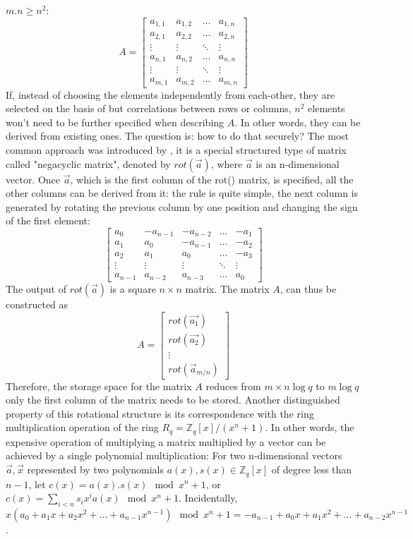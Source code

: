 \begin{description}
  $m.n \geq n^2$:
  \[
    A = \begin{bmatrix}
      a_{1,1}& a_{1,2}& \dots& a_{1,n}\\
      a_{2,1}& a_{2,2}& \dots& a_{2,n}\\
      \vdots& \vdots& \ddots& \vdots\\
      a_{n,1}& a_{n,2}& \dots& a_{n,n}\\
      \vdots& \vdots& \ddots& \vdots\\
      a_{m,1}& a_{m,2}& \dots& a_{m,n}
    \end{bmatrix}
  \]
  If, instead of choosing the elements independently from each-other, they are selected on the basis of but correlations between rows or columns, $n^2$ elements won't need to be further specified when describing $A$. In other words, they can be derived from existing
  ones. The question is: how to do that securely? The most common approach was
  introduced by \cite{hoffstein1998ntru, micciancio2007generalized}, it is a
  special structured type of matrix called "negacyclic matrix", denoted by
  $rot(\vec{a})$, where $\vec{a}$ is an n-dimensional vector. Once $\vec{a}$, which is the first column of the rot() matrix, is specified,  all the other
  columns can be derived from it: the rule is quite simple, the
  next column is generated by rotating the previous column by one position and
  changing the sign of the first element:
  \[
    \begin{bmatrix}
      a_{0}& -a_{n-1}& -a_{n-2}& \dots& -a_1\\
      a_1& a_0& -a_{n-1}& \dots& -a_2\\
      a_2& a_1& a_0& \dots& -a_3\\
      \vdots& \vdots& \vdots& \ddots& \vdots\\
      a_{n-1}& a_{n-2}& a_{n-3}& \dots& a_0
    \end{bmatrix}
  \]
  The output of $rot(\vec{a})$ is a square $n \times n$ matrix. The matrix $A$, can thus be constructed as
  \[
    A = \begin{bmatrix}
      rot(\vec{a_1})\\
      rot(\vec{a_2})\\
      \vdots\\
      rot(\vec{a}_{m/n})
    \end{bmatrix}
  \]
  Therefore, the storage space for the matrix $A$ reduces from $m \times n \log q$ to
  $m \log q$ only the first column of the matrix needs to be stored.  Another
  distinguished property of this rotational structure is its correspondence with the ring
  multiplication operation of the ring $R_q = \mathbb{Z}_q[x]/(x^n+1)$. In other
  words, the expensive operation of multiplying a matrix multiplied by a vector can be
  achieved by a single polynomial multiplication: For two n-dimensional vectors
  $\vec{a}, \vec{x}$ represented by two polynomials
  $a(x), s(x) \in \mathbb{Z}_q[x]$ of degree less than $n -1$, let
  $c(x) = a(x).s(x) \mod x^n + 1$, or
  $c(x) = \sum_{i<n}s_ix^ia(x) \mod x^n + 1$. Incidentally,
  $x(a_0 + a_1x + a_2x^2 + \dots + a_{n-1}x^{n-1}) \mod x^n + 1 =-a_{n-1} + a_0x
  + a_1x^2 + \dots + a_{n-2}x^{n-1}$.


\end{description}
